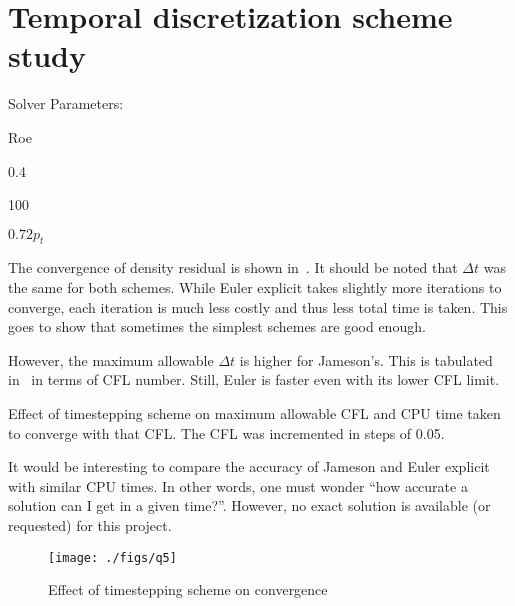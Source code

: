 \section{Temporal discretization scheme study}
Solver Parameters:
\begin{description}[noitemsep]
    \item[Spatial Scheme:] Roe
    \item[CFL:] 0.4
    \item[Grid Points:] 100
    \item[\pexit:] $0.72 p_t$
\end{description}
The convergence of density residual is shown in~. It should be
noted that $\Delta t$ was the same for both schemes. While Euler explicit
takes slightly more iterations to converge, each iteration is much less costly and thus
less total time is taken. This goes to show that sometimes the simplest schemes are
good enough.

However, the maximum allowable $\Delta t$ is higher for Jameson's. This is tabulated
in~ in terms of CFL number. Still, Euler is faster even with its lower
CFL limit.
\begin{table}[H]
    \centering
    \caption{Effect of timestepping scheme on maximum allowable CFL and
        CPU time taken to converge with that CFL. The CFL was incremented in
        steps of 0.05.}
    \label{tab:q5}
    
\end{table}

It would be interesting to compare the accuracy of Jameson and Euler explicit with similar
CPU times. In other words, one must wonder ``how accurate a solution can I get in a given
time?''. However, no exact solution is available (or requested) for this project.

\begin{figure}
    \centering
    \texttt{[image: ./figs/q5]}
    \caption{Effect of timestepping scheme on convergence}\label{fig:q5}
\end{figure}


